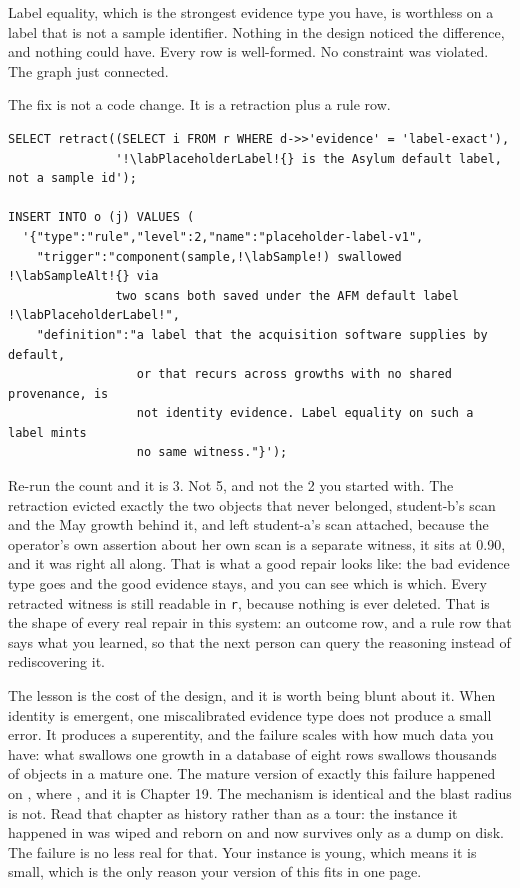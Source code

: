 Label equality, which is the strongest evidence type you have, is worthless on a label that is not a sample identifier. Nothing in the design noticed the difference, and nothing could have. Every row is well-formed. No constraint was violated. The graph just connected.

The fix is not a code change. It is a retraction plus a rule row.

\begin{lstlisting}
SELECT retract((SELECT i FROM r WHERE d->>'evidence' = 'label-exact'),
               '!\labPlaceholderLabel!{} is the Asylum default label, not a sample id');

INSERT INTO o (j) VALUES (
  '{"type":"rule","level":2,"name":"placeholder-label-v1",
    "trigger":"component(sample,!\labSample!) swallowed !\labSampleAlt!{} via
               two scans both saved under the AFM default label !\labPlaceholderLabel!",
    "definition":"a label that the acquisition software supplies by default,
                  or that recurs across growths with no shared provenance, is
                  not identity evidence. Label equality on such a label mints
                  no same witness."}');
\end{lstlisting}

Re-run the count and it is 3. Not 5, and not the 2 you started with. The retraction evicted exactly the two objects that never belonged, student-b's scan and the May growth behind it, and left student-a's scan attached, because the operator's own assertion about her own scan is a separate witness, it sits at 0.90, and it was right all along. That is what a good repair looks like: the bad evidence type goes and the good evidence stays, and you can see which is which. Every retracted witness is still readable in \texttt{r}, because nothing is ever deleted. That is the shape of every real repair in this system: an outcome row, and a rule row that says what you learned, so that the next person can query the reasoning instead of rediscovering it.

The lesson is the cost of the design, and it is worth being blunt about it. When identity is emergent, one miscalibrated evidence type does not produce a small error. It produces a superentity, and the failure scales with how much data you have: what swallows one growth in a database of eight rows swallows thousands of objects in a mature one. The mature version of exactly this failure happened on \labLineage, where \labLineageFailure, and it is Chapter 19. The mechanism is identical and the blast radius is not. Read that chapter as history rather than as a tour: the instance it happened in was wiped and reborn on \labLineageWipeDate{} and now survives only as a dump on disk. The failure is no less real for that. Your instance is young, which means it is small, which is the only reason your version of this fits in one page.

